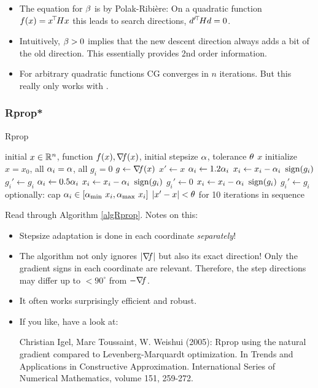\begin{itemize}
\item The equation for $\beta$ is by Polak-Ribi{\`e}re: On a quadratic
function $f(x) = x^{\!\top\!} H x$ this leads to  search
   directions, $d'^{\!\top\!} H d = 0$.

\item Intuitively, $\beta>0$ implies that the new descent direction always adds a bit of the old
   direction. This essentially provides 2nd order information.

\item For arbitrary quadratic functions CG converges in $n$ iterations. But
 this really only works with .
\end{itemize}


\subsubsection{Rprop*}

\begin{algorithm}[t]\caption{Rprop}\label{algRprop}
\begin{algorithmic}[1]
\Require initial $x\in{\mathbb{R}}^n$, function $f(x), {\nabla_{\!\!}} f(x)$, initial stepsize $\alpha$, tolerance $\theta$
\Ensure $x$
\State initialize $x=x_0$, all $\alpha_i=\alpha$, all $g_i=0$
\Repeat
\State $g \gets {\nabla_{\!\!}} f(x)$
\State $x' \gets x$
 
\State $\alpha_i \gets 1.2 \alpha_i$
\State $x_i \gets x_i - \alpha_i~ \operatorname{sign}(g_i)$
\State $g_i' \gets g_i$
 
\State $\alpha_i \gets 0.5 \alpha_i$
\State $x_i \gets x_i - \alpha_i~ \operatorname{sign}(g_i)$
\State $g_i' \gets 0$ 
\Else
\State $x_i \gets x_i - \alpha_i~ \operatorname{sign}(g_i)$
\State $g_i' \gets g_i$
\EndIf
\State optionally: cap $\alpha_i \in [\alpha_{\text{min}}~ x_i, \alpha_{\text{max}}~ x_i]$
\EndFor
\Until $|x'-x| <\theta$ for 10 iterations in sequence
\end{algorithmic}
\end{algorithm}

Read through Algorithm \ref{algRprop}. Notes on this:
\begin{itemize}
\item Stepsize adaptation is done in each coordinate \emph{separately}!
\item The algorithm not only ignores $|{\nabla_{\!\!}} f|$ but also its exact
direction! Only the gradient signs in each coordinate are
relevant. Therefore, the step directions may differ up to $<90^\circ$ from $-{\nabla_{\!\!}} f$.
\item It often works surprisingly efficient and robust.
\item If you like, have a look at:

{\small

Christian Igel, Marc Toussaint, W. Weishui (2005): Rprop using the
natural gradient compared to Levenberg-Marquardt optimization. In
Trends and Applications in Constructive Approximation. International
Series of Numerical Mathematics, volume 151, 259-272.

}
\end{itemize}


